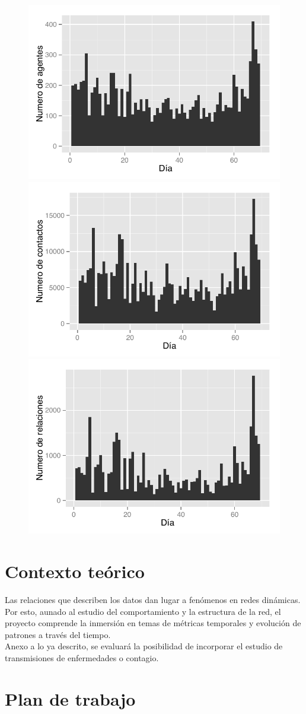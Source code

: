 \documentclass[10pt]{article}
\begin{document}
\begin{figure}[!h]
\centering
\includegraphics[width = .48\textwidth]{../Figs/agentes.pdf} 
\includegraphics[width = .48\textwidth]{../Figs/contactos.pdf}\\
\includegraphics[width = .48\textwidth]{../Figs/relaciones.pdf}
\end{figure}



\section{Contexto teórico}

Las relaciones que describen los datos dan lugar a fenómenos en redes
dinámicas. Por esto, aunado al estudio del comportamiento y la estructura
de la red, el proyecto comprende la inmersión en temas de métricas temporales y
evolución de patrones a través del tiempo.\\

Anexo a lo ya descrito, se evaluará la posibilidad de incorporar el estudio de
transmisiones de enfermedades o contagio.



\section{Plan de trabajo}
\label{sec:plan}
\end{document}
